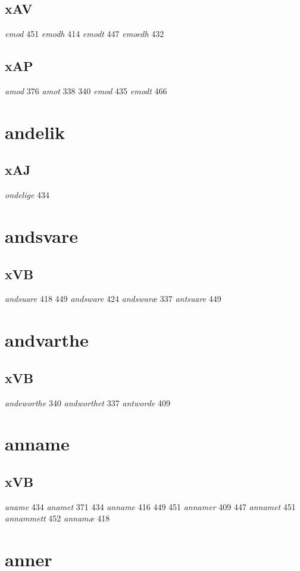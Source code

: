 \documentclass[a4paper,twocolumn]{article}
\begin{document}
\subsection{xAV}
\label{sec:org07cc3b6}
\emph{emod} 451 \emph{emodh} 414 \emph{emodt} 447 \emph{emoedh} 432 
\subsection{xAP}
\label{sec:org2aabe8e}
\emph{amod} 376 \emph{amot} 338 340 \emph{emod} 435 \emph{emodt} 466 
\section{andelik}
\label{sec:orgb5a956f}
\subsection{xAJ}
\label{sec:orga141ca8}
\emph{ondelige} 434 
\section{andsvare}
\label{sec:orge953684}
\subsection{xVB}
\label{sec:orgf387cff}
\emph{andsuare} 418 449 \emph{andsware} 424 \emph{andswaræ} 337 \emph{antsuare} 449 
\section{andvarthe}
\label{sec:org00c3dbf}
\subsection{xVB}
\label{sec:orgbd719f6}
\emph{andeworthe} 340 \emph{andworthet} 337 \emph{antworde} 409 
\section{anname}
\label{sec:org8fd63c1}
\subsection{xVB}
\label{sec:org9cf4ea9}
\emph{aname} 434 \emph{anamet} 371 434 \emph{anname} 416 449 451 \emph{annamer} 409 447 \emph{annamet} 451 \emph{annammett} 452 \emph{annamæ} 418 
\section{anner}
\label{sec:org6ca391a}
\end{document}

